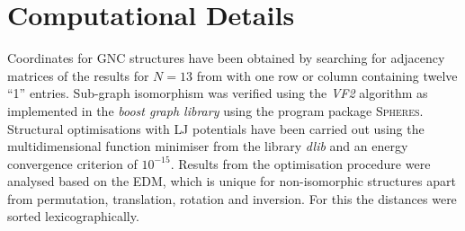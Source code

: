 
\section{Computational Details}

Coordinates for \ac{GNC} structures have been obtained by searching for
adjacency matrices of the results for $N=13$ from
\citeauthor{Holmes-Cerfon_EnumeratingRigidSphere_2016}
\autocite{Holmes-Cerfon_EnumeratingRigidSphere_2016} with one row or column
containing twelve ``1'' entries. Sub-graph isomorphism was verified using the
\textit{VF2} algorithm \autocite{Cordella_SubGraphIsomorphism_2004} as
implemented in the \textit{boost graph library}
\autocite{Siek_BoostGraphLibrary_2002} using the program package
\textsc{Spheres}. Structural optimisations with \ac{LJ} potentials have been
carried out using the multidimensional function minimiser from the \Cpp library
\textit{dlib} \autocite{King_DlibmlMachineLearning_2009} and an energy
convergence criterion of $10^{-15}$. Results from the optimisation procedure
were analysed based on the \ac{EDM}, which is unique for non-isomorphic
structures apart from permutation, translation, rotation and inversion. For this
the distances were sorted lexicographically.


